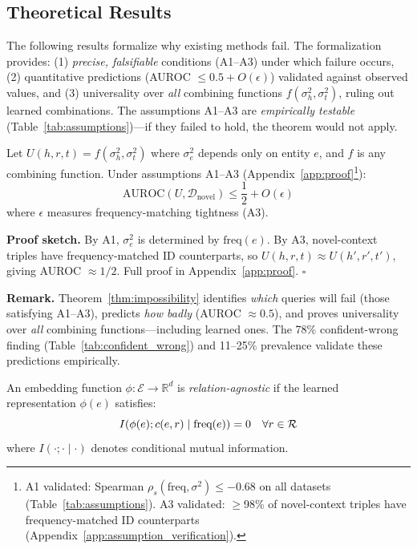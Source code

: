 \subsection{Theoretical Results}

The following results formalize why existing methods fail. The formalization provides: (1) \emph{precise, falsifiable} conditions (A1--A3) under which failure occurs, (2) quantitative predictions (AUROC $\leq 0.5 + O(\epsilon)$) validated against observed values, and (3) universality over \emph{all} combining functions $f(\sigma^2_h, \sigma^2_t)$, ruling out learned combinations. The assumptions A1--A3 are \emph{empirically testable} (Table~\ref{tab:assumptions})---if they failed to hold, the theorem would not apply.

\begin{theorem}
\label{thm:impossibility}
Let $U(h,r,t) = f(\sigma^2_h, \sigma^2_t)$ where $\sigma^2_e$ depends only on entity $e$, and $f$ is any combining function. Under assumptions A1--A3 (Appendix~\ref{app:proof}\footnote{A1 validated: Spearman $\rho_s(\text{freq}, \sigma^2) \leq {-}0.68$ on all datasets (Table~\ref{tab:assumptions}). A3 validated: $\geq$98\% of novel-context triples have frequency-matched ID counterparts (Appendix~\ref{app:assumption_verification}).}):
\begin{equation}
    \text{AUROC}(U, \mathcal{D}_{\text{novel}}) \leq \frac{1}{2} + O(\epsilon)
\end{equation}
where $\epsilon$ measures frequency-matching tightness (A3).
\end{theorem}

\textbf{Proof sketch.} By A1, $\sigma^2_e$ is determined by $\text{freq}(e)$. By A3, novel-context triples have frequency-matched ID counterparts, so $U(h,r,t) \approx U(h',r',t')$, giving AUROC $\approx 1/2$. Full proof in Appendix~\ref{app:proof}. $\square$

\textbf{Remark.} Theorem~\ref{thm:impossibility} identifies \emph{which} queries will fail (those satisfying A1--A3), predicts \emph{how badly} (AUROC $\approx 0.5$), and proves universality over \emph{all} combining functions---including learned ones. The 78\% confident-wrong finding (Table~\ref{tab:confident_wrong}) and 11--25\% prevalence validate these predictions empirically.

\begin{definition}
\label{def:relation_agnostic}
An embedding function $\phi: \mathcal{E} \to \mathbb{R}^d$ is \emph{relation-agnostic} if the learned representation $\phi(e)$ satisfies:
\begin{equation}
I(\phi(e); c(e,r) \mid \text{freq}(e)) = 0 \quad \forall r \in \mathcal{R}
\label{eq:ra_condition}
\end{equation}
where $I(\cdot;\cdot\mid\cdot)$ denotes conditional mutual information.
\end{definition}

